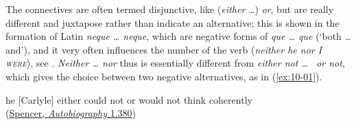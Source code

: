 The connectives are often termed disjunctive, like (\textit{either} {\dots}) \textit{or}, but are really different and juxtapose rather than indicate an alternative; this is shown in the formation of Latin 
\textit{neque {\dots} neque}, which are negative forms of \textit{que {\dots} que} (`both {\dots} and'), and it very often influences the number of the verb (\textit{neither he nor I \textsc{were}}), see \citet[\href{https://archive.org/details/jespersen-1954-a-modern-english-grammar-on-historical-principles-part-ii-syntax-first-volume/page/176/mode/2up?view=theater}{6.62}]{jespersenMEG2}. \textit{Neither {\dots} nor} thus is essentially different from \textit{either not {\dots} \ or not}, which gives the choice between two negative alternatives, as in (\ref{ex:10-01}).

\ea \label{ex:10-01}
he [Carlyle] either could not or would not think coherently\\\hfill(\href{https://archive.org/details/autobiographyher0000herb/page/380/mode/2up?q=%22either+could+not+or%22&view=theater}{Spencer, \textit{Autobiography} 1.380})
\z

